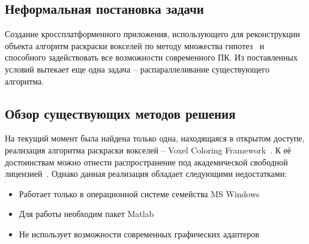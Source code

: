 \subsection{Неформальная постановка задачи}
Создание кроссплатформенного приложения, использующего для реконструкции объекта алгоритм раскраски вокселей по методу множества гипотез~\cite{multi_hypothesis} и способного задействовать все возможности современного ПК. Из поставленных условий вытекает еще одна задача -- распараллеливание существующего алгоритма.

\subsection{Обзор существующих методов решения}

На текущий момент была найдена только одна, находящаяся в открытом доступе, реализация алгоритма раскраски вокселей -- Voxel Coloring Framework~\cite{voxel_coloring_framework}. К её достоинствам можно отнести распространение под академической свободной лицензией~\cite{academic_free_license}. Однако данная реализация обладает следующими недостатками:
\begin{itemize}
\item Работает только в операционной системе семейства MS Windows
\item Для работы необходим пакет Matlab
\item Не использует возможности современных графических адаптеров
\end{itemize}
